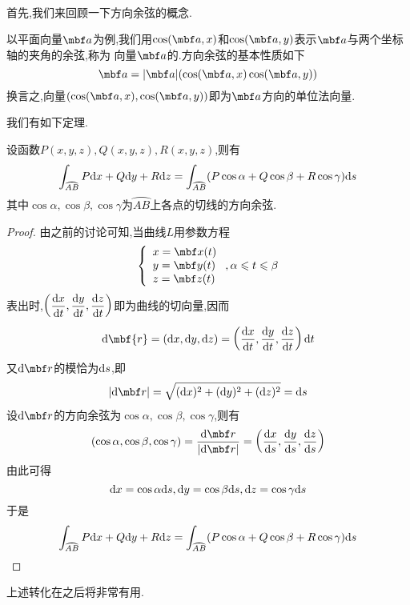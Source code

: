 \documentclass{ctexart}
\begin{document}
\\
首先,我们来回顾一下方向余弦的概念.
\begin{definition}[3.1 向量的方向余弦]
    以平面向量$\mbf a$为例,我们用$\cos(\mbf a,x)$和$\cos(\mbf a,y)$表示$\mbf a$与两个坐标轴的夹角的余弦,称为%
    向量$\mbf a$的.方向余弦的基本性质如下
    \[\mbf a=|\mbf a|(\cos(\mbf a,x)\cos(\mbf a,y))\]
    换言之,向量$(\cos(\mbf a,x),\cos(\mbf a,y))$即为$\mbf a$方向的单位法向量.
\end{definition}
我们有如下定理.
\begin{formal}[3.2 第一型和第二型曲线积分的联系]
    设函数$P(x,y,z),Q(x,y,z),R(x,y,z)$,则有
    \[\int_{\wideparen{AB}}P\di x+Q\di y+R\di z=\int_{\wideparen{AB}}(P\cos\alpha+Q\cos\beta+R\cos\gamma)\di s\]
    其中$\cos\alpha,\cos\beta,\cos\gamma$为$\wideparen{AB}$上各点的切线的方向余弦.
\end{formal}
\begin{proof}
    由之前的讨论可知,当曲线$L$用参数方程
\[\left\{\begin{array}{l}
    x=\mbf x(t)\\y=\mbf y(t)\\z=\mbf z(t)
    \end{array}\right.,\alpha\leqslant t\leqslant\beta\]
    表出时,$\left(\dfrac{\mathrm{d} x}{\mathrm{d} t},\dfrac{\mathrm{d} y}{\mathrm{d} t},\dfrac{\mathrm{d} z}{\mathrm{d} t}\right)$即为曲线的切向量,因而
    \[\di\mbf{r}=(\di x,\di y,\di z)=\left(\dfrac{\dx}{\di t},\dfrac{\di y}{\di t},\dfrac{\di z}{\di t}\right)\di t\]
    又$\di\mbf r$的模恰为$\mathrm{d} s$,即
    \[|\di\mbf r|=\sqrt{(\di x)^2+(\di y)^2+(\di z)^2}=\di s\]
    设$\di\mbf r$的方向余弦为$\cos\alpha,\cos\beta,\cos\gamma$,则有
    \[(\cos\alpha,\cos\beta,\cos\gamma)=\dfrac{\di\mbf r}{|\di\mbf r|}=\left(\dfrac{\di x}{\di s},\dfrac{\di y}{\di s},\dfrac{\di z}{\di s}\right)\]
    由此可得
    \[\mathrm{d} x=\cos\alpha\mathrm{d} s,\mathrm{d} y=\cos\beta\mathrm{d} s,\mathrm{d} z=\cos\gamma\mathrm{d} s\]
    于是
    \[\int_{\wideparen{AB}}P\di x+Q\di y+R\di z=\int_{\wideparen{AB}}(P\cos\alpha+Q\cos\beta+R\cos\gamma)\di s\]
\end{proof}\noindent
上述转化在之后将非常有用.
\end{document}
